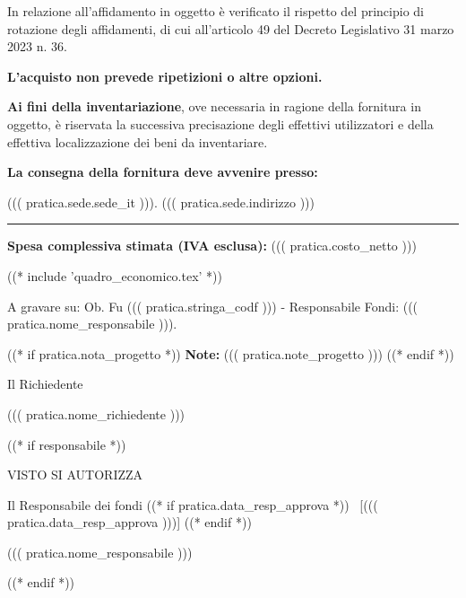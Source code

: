 In relazione all’affidamento in oggetto è verificato il rispetto del
principio di rotazione degli affidamenti, di cui all’articolo 49 del
Decreto Legislativo 31 marzo 2023 n. 36. 

\textbf{L’acquisto non prevede ripetizioni o altre opzioni.}

\textbf{Ai fini della inventariazione}, ove necessaria in ragione della fornitura
in oggetto, è riservata la successiva precisazione degli effettivi
utilizzatori e della effettiva localizzazione dei beni da inventariare.

\textbf{La consegna della fornitura deve avvenire presso:}

((( pratica.sede.sede_it ))). ((( pratica.sede.indirizzo )))
\par\noindent\rule{\textwidth}{0.4pt}

\textbf{Spesa complessiva stimata (IVA esclusa):} ((( pratica.costo_netto ))) 

((* include 'quadro_economico.tex' *))

\begin{minipage}{\linewidth}
A gravare su: Ob. Fu ((( pratica.stringa_codf ))) - 
Responsabile Fondi: ((( pratica.nome_responsabile ))).

((* if pratica.nota_progetto *))
\vspace{0.5cm}
\textbf{Note:}
	((( pratica.note_progetto )))
((* endif *))

\vspace{0.5cm}
\begin{flushright}
\begin{minipage}[c]{6cm}
\begin{center}
Il Richiedente

((( pratica.nome_richiedente )))

\end{center}
\end{minipage}
\end{flushright}
\end{minipage}

((* if responsabile *))
\begin{minipage}{\linewidth}
\begin{center}
	VISTO SI AUTORIZZA
\end{center}
\vspace{8mm}

\begin{flushright}
\begin{minipage}[c]{6cm}
\begin{center}
Il Responsabile dei fondi
((* if pratica.data_resp_approva *)) ~[((( pratica.data_resp_approva )))] ((* endif *))

((( pratica.nome_responsabile )))

\end{center}
\end{minipage}
\end{flushright}
\end{minipage}
((* endif *))

